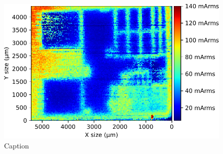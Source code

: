 
\begin{figure}[h]
	\centering
	\includegraphics[width=\columnwidth]{./figures/pos_neg_IGND.pdf}
	\caption{Caption}
	\label{stm_ignd}
\end{figure}
